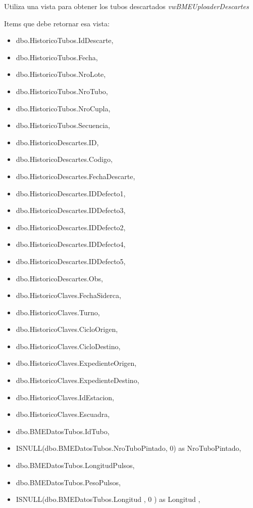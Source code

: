 \documentclass[]{article}
\begin{document}
\par Utiliza una vista para obtener los tubos descartados \emph{vwBMEUploaderDescartes}

\par Items que debe retornar esa vista:

\begin{itemize}[label=\textcolor{blue}{\textbullet}]
	\item dbo.HistoricoTubos.IdDescarte, 
	\item dbo.HistoricoTubos.Fecha, 
	\item dbo.HistoricoTubos.NroLote, 
	\item dbo.HistoricoTubos.NroTubo, 
	\item dbo.HistoricoTubos.NroCupla, 
	\item dbo.HistoricoTubos.Secuencia, 
	\item dbo.HistoricoDescartes.ID, 
	\item dbo.HistoricoDescartes.Codigo, 
	\item dbo.HistoricoDescartes.FechaDescarte,
	\item dbo.HistoricoDescartes.IDDefecto1,
	\item dbo.HistoricoDescartes.IDDefecto3,
	\item dbo.HistoricoDescartes.IDDefecto2, 
	\item dbo.HistoricoDescartes.IDDefecto4,
	\item dbo.HistoricoDescartes.IDDefecto5, 
	\item dbo.HistoricoDescartes.Obs, 
	\item dbo.HistoricoClaves.FechaSiderca, 
	\item dbo.HistoricoClaves.Turno, 
	\item dbo.HistoricoClaves.CicloOrigen,
	\item dbo.HistoricoClaves.CicloDestino,
	\item dbo.HistoricoClaves.ExpedienteOrigen,
	\item dbo.HistoricoClaves.ExpedienteDestino,
	\item dbo.HistoricoClaves.IdEstacion, 
	\item dbo.HistoricoClaves.Escuadra, 
	\item dbo.BMEDatosTubos.IdTubo, 
	\item ISNULL(dbo.BMEDatosTubos.NroTuboPintado, 0) as NroTuboPintado, 
	\item dbo.BMEDatosTubos.LongitudPulsos, 
	\item dbo.BMEDatosTubos.PesoPulsos, 
	\item ISNULL(dbo.BMEDatosTubos.Longitud , 0 ) as Longitud , 

\end{itemize}
\end{document}
